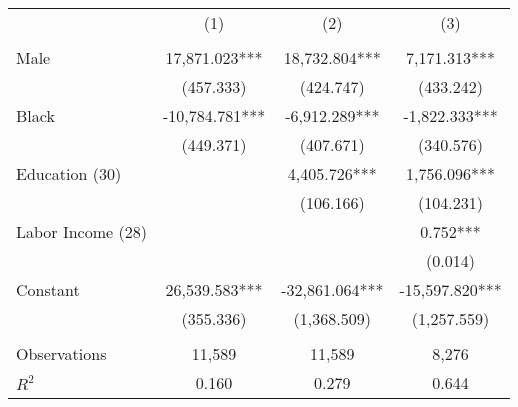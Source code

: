 \begin{tabular}{lccc} \toprule
 & (1) & (2) & (3) \\ \\ \midrule
Male & 17,871.023*** & 18,732.804*** & 7,171.313*** \\
 & (457.333) & (424.747) & (433.242) \\
Black & -10,784.781*** & -6,912.289*** & -1,822.333*** \\
 & (449.371) & (407.671) & (340.576) \\
Education (30) &  & 4,405.726*** & 1,756.096*** \\
 &  & (106.166) & (104.231) \\
Labor Income (28) &  &  & 0.752*** \\
 &  &  & (0.014) \\
Constant & 26,539.583*** & -32,861.064*** & -15,597.820*** \\
 & (355.336) & (1,368.509) & (1,257.559) \\ \\ \midrule
 Observations & 11,589 & 11,589 & 8,276 \\
$R^2$ & 0.160 & 0.279 & 0.644 \\ \hline
\end{tabular}
